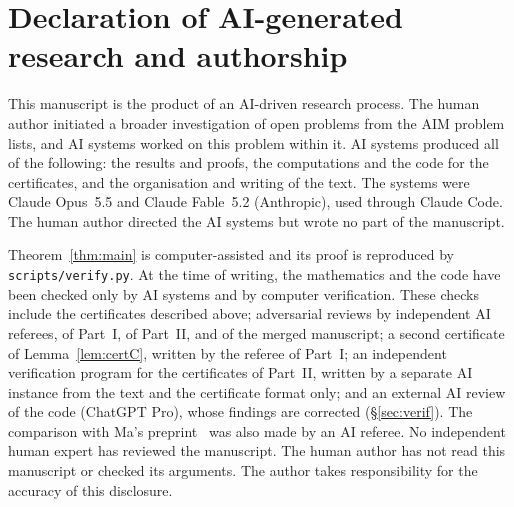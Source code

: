 \documentclass[11pt]{article}
\theoremstyle{remark}
\begin{document}
\section*{Declaration of AI-generated research and authorship}
This manuscript is the product of an AI-driven research process. The human author initiated a broader
investigation of open problems from the AIM problem lists, and AI systems worked on this problem within
it. AI systems produced all of the following: the results and proofs, the computations and the code for
the certificates, and the organisation and writing of the text. The systems were Claude Opus~5.5 and
Claude Fable~5.2 (Anthropic), used through Claude Code. The human author directed the AI systems but
wrote no part of the manuscript.

Theorem~\ref{thm:main} is computer-assisted and its proof is reproduced by \texttt{scripts/verify.py}.
At the time of writing, the mathematics and the code have been checked only by AI systems and by
computer verification. These checks include the certificates described above; adversarial reviews by
independent AI referees, of Part~I, of Part~II, and of the merged manuscript; a second certificate of
Lemma~\ref{lem:certC}, written by the referee of Part~I; an independent verification program for the
certificates of Part~II, written by a separate AI instance from the text and the certificate format
only; and an external AI review of the code (ChatGPT Pro), whose findings are corrected
(\S\ref{sec:verif}). The comparison with Ma's preprint~\cite{Ma} was also made by an AI referee. No independent human
expert has reviewed the manuscript. The human author has not read this manuscript or checked its
arguments. The author takes responsibility for the accuracy of this disclosure.
\end{document}
